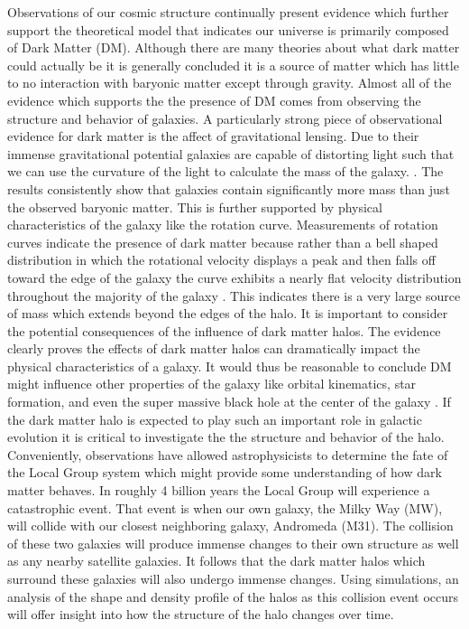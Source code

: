 \documentclass[fleqn,usenatbib]{mnras}
\begin{document}
\hspace{6mm}Observations of our cosmic structure continually present evidence which further support the theoretical model that indicates our universe is primarily composed of Dark Matter (DM). Although there are many theories about what dark matter could actually be it is generally concluded it is a source of matter which has little to no interaction with baryonic matter except through gravity. Almost all of the evidence which supports the the presence of DM comes from observing the structure and behavior of galaxies. A particularly strong piece of observational evidence for dark matter is the affect of gravitational lensing. Due to their immense gravitational potential galaxies are capable of distorting light such that we can use the curvature of the light to calculate the mass of the galaxy. \citep{Massey_2010}. The results consistently show that galaxies contain significantly more mass than just the observed baryonic matter. This is further supported by physical characteristics of the galaxy like the rotation curve. Measurements of rotation curves indicate the presence of dark matter because rather than a bell shaped distribution in which the rotational velocity displays a peak and then falls off toward the edge of the galaxy the curve exhibits a nearly flat velocity distribution throughout the majority of the galaxy \citep{Hoeneisen19}. This indicates there is a very large source of mass which extends beyond the edges of the halo. It is important to consider the potential consequences of the influence of dark matter halos. The evidence clearly proves the effects of dark matter halos can dramatically impact the physical characteristics of a galaxy. It would thus be reasonable to conclude DM might influence other properties of the galaxy like orbital kinematics, star formation, and even the super massive black hole at the center of the galaxy \citep{Springel05}. If the dark matter halo is expected to play such an important role in galactic evolution it is critical to investigate the the structure and behavior of the halo. Conveniently, observations have allowed astrophysicists to determine the fate of the Local Group system which might provide some understanding of how dark matter behaves. In roughly 4 billion years the Local Group will experience a catastrophic event. That event is when our own galaxy, the Milky Way (MW), will collide with our closest neighboring galaxy, Andromeda (M31). The collision of these two galaxies will produce immense changes to their own structure as well as any nearby satellite galaxies. It follows that the dark matter halos which surround these galaxies will also undergo immense changes. Using simulations, an analysis of the shape and density profile of the halos as this collision event occurs will offer insight into how the structure of the halo changes over time. 
\end{document}
